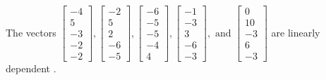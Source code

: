 \begin{exercise}
\begin{exerciseStatement}
  \end{exerciseStatement}
  \begin{exerciseAnswer}
   The vectors \(\left[\begin{array}{r}
-4 \\
5 \\
-3 \\
-2 \\
-2
\end{array}\right] , \left[\begin{array}{r}
-2 \\
5 \\
2 \\
-6 \\
-5
\end{array}\right] , \left[\begin{array}{r}
-6 \\
-5 \\
-5 \\
-4 \\
4
\end{array}\right] , \left[\begin{array}{r}
-1 \\
-3 \\
3 \\
-6 \\
-3
\end{array}\right] , \text{ and } \left[\begin{array}{r}
0 \\
10 \\
-3 \\
6 \\
-3
\end{array}\right]\) are 
  	 linearly dependent  .
  


  \end{exerciseAnswer}
\end{exercise}